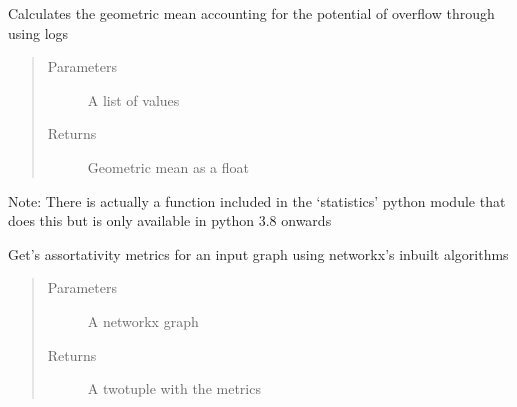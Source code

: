 \documentclass[letterpaper,10pt,english]{sphinxmanual}
\begin{document}
\begin{fulllineitems}
\label{\detokenize{source/yawning_titan.experiment_helpers:yawning_titan.experiment_helpers.graph_metrics.geometric_mean_overflow}}
\sphinxAtStartPar
Calculates the geometric mean accounting for the
potential of overflow through using logs
\begin{quote}\begin{description}
\item[{Parameters}] \leavevmode
\sphinxAtStartPar
{} \textendash{} A list of values

\item[{Returns}] \leavevmode
\sphinxAtStartPar
Geometric mean as a float

\end{description}\end{quote}

\sphinxAtStartPar
Note: There is actually a function included in the ‘statistics’
python module that does this but is only available in python 3.8 onwards

\end{fulllineitems}


\begin{fulllineitems}
\label{\detokenize{source/yawning_titan.experiment_helpers:yawning_titan.experiment_helpers.graph_metrics.get_assortativity_metrics}}
\sphinxAtStartPar
Get’s assortativity metrics for an input graph using
networkx’s in\sphinxhyphen{}built algorithms
\begin{quote}\begin{description}
\item[{Parameters}] \leavevmode
\sphinxAtStartPar
{} \textendash{} A networkx graph

\item[{Returns}] \leavevmode
\sphinxAtStartPar
A two\sphinxhyphen{}tuple with the metrics

\end{description}\end{quote}

\end{fulllineitems}
\end{document}
